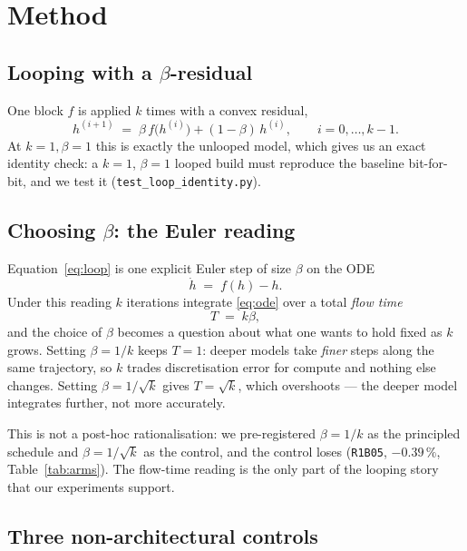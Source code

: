 \section{Method}
\label{sec:method}

\subsection{Looping with a \texorpdfstring{$\beta$}{beta}-residual}

One block $f$ is applied $k$ times with a convex residual,
\begin{equation}
  h^{(i+1)} \;=\; \beta\, f\bigl(h^{(i)}\bigr) + (1-\beta)\, h^{(i)},
  \qquad i = 0,\dots,k-1 .
  \label{eq:loop}
\end{equation}
At $k=1,\beta=1$ this is exactly the unlooped model, which gives us an exact
identity check: a $k=1$, $\beta=1$ looped build must reproduce the baseline
bit-for-bit, and we test it (\texttt{test\_loop\_identity.py}).

\subsection{Choosing \texorpdfstring{$\beta$}{beta}: the Euler reading}
\label{sec:method:euler}

Equation~\eqref{eq:loop} is one explicit Euler step of size $\beta$ on the ODE
\begin{equation}
  \dot h \;=\; f(h) - h .
  \label{eq:ode}
\end{equation}
Under this reading $k$ iterations integrate \eqref{eq:ode} over a total
\emph{flow time}
\[
  T \;=\; k\beta ,
\]
and the choice of $\beta$ becomes a question about what one wants to hold
fixed as $k$ grows. Setting $\beta = 1/k$ keeps $T=1$: deeper models take
\emph{finer} steps along the same trajectory, so $k$ trades discretisation
error for compute and nothing else changes. Setting $\beta = 1/\sqrt{k}$ gives
$T = \sqrt{k}$, which overshoots --- the deeper model integrates further, not
more accurately.

This is not a post-hoc rationalisation: we pre-registered $\beta=1/k$ as the
principled schedule and $\beta=1/\sqrt{k}$ as the control, and the control
loses (\texttt{R1B05}, $-0.39\,\%$, Table~\ref{tab:arms}). The flow-time
reading is the only part of the looping story that our experiments support.

\subsection{Three non-architectural controls}
\label{sec:method:levers}

